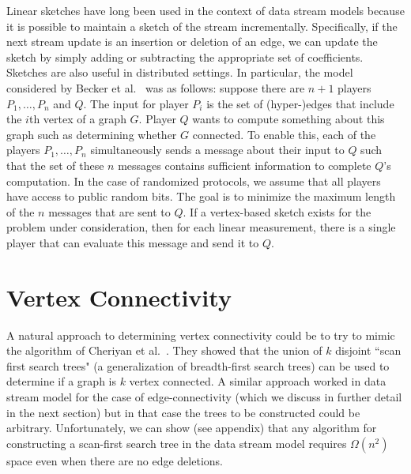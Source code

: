 Linear sketches have long been used in the context of data stream models because it is possible to maintain a sketch of the stream incrementally. Specifically, if the next stream update is an insertion or deletion of an edge, we can update the sketch by simply adding or subtracting the appropriate set of coefficients.
Sketches are also useful in distributed settings. In particular, the model considered by Becker et al.~\cite{BeckerMNRST11} was as follows: suppose there are $n+1$ players $P_1, \ldots, P_n$ and $Q$. The input for player $P_i$ is the set of (hyper-)edges that include the $i$th vertex of a graph $G$. Player $Q$ wants to compute something about this graph such as determining whether $G$ connected. To enable this, each of the players $P_1, \ldots, P_n$  simultaneously sends a message about their input to $Q$ such that the set of these $n$ messages contains sufficient information to complete $Q$'s computation. In the case of randomized protocols, we assume that all players have access to public random bits. The goal is to minimize the maximum length of the $n$ messages that are sent to $Q$. If a vertex-based sketch exists for the problem under consideration, then for each linear measurement, there is a single player that can evaluate this message and send it to $Q$.

%

\section{Vertex Connectivity}\label{sec:vertex}

A natural approach to determining vertex connectivity could be to try to mimic the algorithm of Cheriyan et al.~\cite{CheriyanKT93}. They showed that the union of $k$ disjoint ``scan first search trees" (a generalization of breadth-first search trees) can be used to determine if a graph is $k$ vertex connected. A similar approach worked in data stream model for the case of edge-connectivity (which we discuss in further detail in the next section) but in that case the trees to be constructed could be arbitrary. Unfortunately, we can show (see appendix) that any algorithm for constructing a scan-first search tree in the data stream model requires $\Omega(n^2)$ space even when there are no edge deletions.

%

